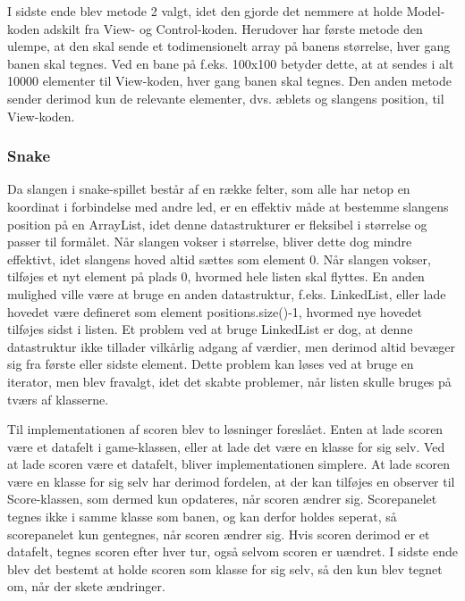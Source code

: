 I sidste ende blev metode 2 valgt, idet den gjorde det nemmere at holde Model-koden adskilt fra View- og Control-koden. Herudover har første metode den ulempe, at den skal sende et todimensionelt array på banens størrelse, hver gang banen skal tegnes. Ved en bane på f.eks. 100x100 betyder dette, at at sendes i alt 10000 elementer til View-koden, hver gang banen skal tegnes. Den anden metode sender derimod kun de relevante elementer, dvs. æblets og slangens position, til View-koden.

\subsubsection{Snake}
Da slangen i snake-spillet består af en række felter, som alle har netop en koordinat i forbindelse med andre led, er en effektiv måde at bestemme slangens position på en ArrayList, idet denne datastrukturer er fleksibel i størrelse og passer til formålet. Når slangen vokser i størrelse, bliver dette dog mindre effektivt, idet slangens hoved altid sættes som element 0. Når slangen vokser, tilføjes et nyt element på plads 0, hvormed hele listen skal flyttes. En anden mulighed ville være at bruge en anden datastruktur, f.eks. LinkedList, eller lade hovedet være defineret som element positions.size()-1, hvormed nye hovedet tilføjes sidst i listen. Et problem ved at bruge LinkedList er dog, at denne datastruktur ikke tillader vilkårlig adgang af værdier, men derimod altid bevæger sig fra første eller sidste element. Dette problem kan løses ved at bruge en iterator, men blev fravalgt, idet det skabte problemer, når listen skulle bruges på tværs af klasserne.

Til implementationen af scoren blev to løsninger foreslået. Enten at lade scoren være et datafelt i game-klassen, eller at lade det være en klasse for sig selv. Ved at lade scoren være et datafelt, bliver implementationen simplere. At lade scoren være en klasse for sig selv har derimod fordelen, at der kan tilføjes en observer til Score-klassen, som dermed kun opdateres, når scoren ændrer sig. Scorepanelet tegnes ikke i samme klasse som banen, og kan derfor holdes seperat, så scorepanelet kun gentegnes, når scoren ændrer sig. Hvis scoren derimod er et datafelt, tegnes scoren efter hver tur, også selvom scoren er uændret. I sidste ende blev det bestemt at holde scoren som klasse for sig selv, så den kun blev tegnet om, når der skete ændringer. 

